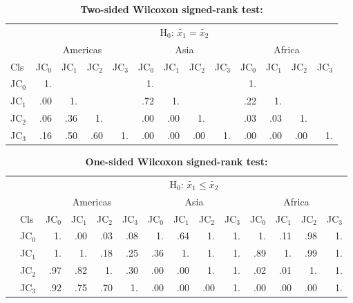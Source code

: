 		\begin{table}[ht]
			\centering
			\caption[Two-sided Wilcoxon signed-rank test]{\textbf{Two-sided Wilcoxon signed-rank test:}}
			\label{tab:wilcoxontwosided}
			\begin{tabular}{lrrrr|rrrr|rrrr}
				& \multicolumn{12}{c}{H$_0$: $\tilde{x_1}=\tilde{x_2}$} \\
				& \multicolumn{4}{c|}{Americas} & \multicolumn{4}{c|}{Asia} & \multicolumn{4}{c}{Africa} \\
				Cls & JC$_0$ & JC$_1$ & JC$_2$ & JC$_3$ & JC$_0$ & JC$_1$ & JC$_2$ & JC$_3$ & JC$_0$ & JC$_1$ & JC$_2$ & JC$_3$ \\\hline
				JC$_0$ & 1. &  &  &  & 1. &  &  &  & 1. &  &  & \\
				JC$_1$ & .00 & 1. &  &  & .72 & 1. &  &  & .22 & 1. &  & \\
				JC$_2$ & .06 & .36 & 1. &  & .00 & .00 & 1. &  & .03 & .03 & 1. & \\
				JC$_3$ & .16 & .50 & .60 & 1. & .00 & .00 & .00 & 1. & .00 & .00 & .00 & 1. \\\hline
			\end{tabular}
		\end{table}

		\begin{table}[ht]
			\centering
			\caption[One-sided Wilcoxon signed-rank test]{\textbf{One-sided Wilcoxon signed-rank test:}}
			\label{tab:wilcoxononesided}
			\begin{tabular}{llrrrr|rrrr|rrrr}
				& & \multicolumn{12}{c}{H$_0$: $\tilde{x_1}\leq\tilde{x_2}$} \\
				& & \multicolumn{4}{c|}{Americas} & \multicolumn{4}{c|}{Asia} & \multicolumn{4}{c}{Africa} \\
				& Cls & JC$_0$ & JC$_1$ & JC$_2$ & JC$_3$ & JC$_0$ & JC$_1$ & JC$_2$ & JC$_3$ & JC$_0$ & JC$_1$ & JC$_2$ & JC$_3$ \\\hline
				\multirow{4}{*}{\STAB{\rotatebox[origin=c]{90}{H$_0$: $\tilde{x_1}\geq\tilde{x_2}$}}} & JC$_0$ & 1. & .00 & .03 & .08 & 1. & .64 & 1. & 1. & 1. & .11 & .98 & 1. \\
				& JC$_1$ & 1. & 1. & .18 & .25 & .36 & 1. & 1. & 1. & .89 & 1. & .99 & 1. \\
				& JC$_2$ & .97 & .82 & 1. & .30 & .00 & .00 & 1. & 1. & .02 & .01 & 1. & 1. \\
				& JC$_3$ & .92 & .75 & .70 & 1. & .00 & .00 & .00 & 1. & .00 & .00 & .00 & 1. \\\hline
			\end{tabular}
		\end{table}


